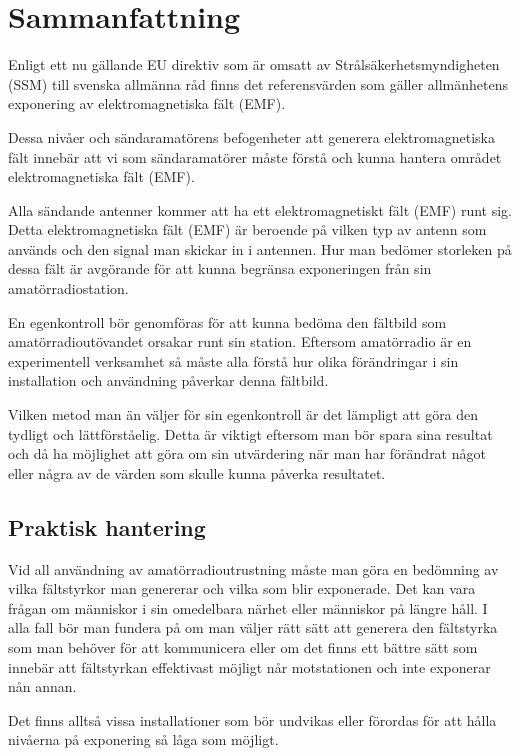 \section{Sammanfattning}

Enligt ett nu gällande EU direktiv som är omsatt av
Strålsäkerhetsmyndigheten (SSM) till svenska allmänna råd finns det
referensvärden som gäller allmänhetens exponering av elektromagnetiska
fält (EMF).

Dessa nivåer och sändaramatörens befogenheter att generera
elektromagnetiska fält innebär att vi som sändaramatörer måste förstå
och kunna hantera området elektromagnetiska fält (EMF).

Alla sändande antenner kommer att ha ett elektromagnetiskt fält (EMF)
runt sig.
Detta elektromagnetiska fält (EMF) är beroende på vilken typ av antenn som
används och den signal man skickar in i antennen.
Hur man bedömer storleken på dessa fält är avgörande för att kunna
begränsa exponeringen från sin amatörradiostation.

En egenkontroll bör genomföras för att kunna bedöma den fältbild som
amatörradioutövandet orsakar runt sin station.
Eftersom amatörradio är en experimentell verksamhet så måste alla förstå hur
olika förändringar i sin installation och användning påverkar denna fältbild.

Vilken metod man än väljer för sin egenkontroll är det lämpligt att
göra den tydligt och lättförståelig.
Detta är viktigt eftersom man bör spara sina resultat och då ha möjlighet att
göra om sin utvärdering när man har förändrat något eller några av de värden
som skulle kunna påverka resultatet.

\subsection{Praktisk hantering}

Vid all användning av amatörradioutrustning måste man göra en bedömning
av vilka fältstyrkor man genererar och vilka som blir exponerade.
Det kan vara frågan om människor i sin omedelbara närhet eller människor
på längre håll.
I alla fall bör man fundera på om man väljer rätt sätt att generera den
fältstyrka som man behöver för att kommunicera eller om det finns ett bättre
sätt som innebär att fältstyrkan effektivast möjligt når motstationen och inte
exponerar nån annan.

Det finns alltså vissa installationer som bör undvikas eller förordas
för att hålla nivåerna på exponering så låga som möjligt.

